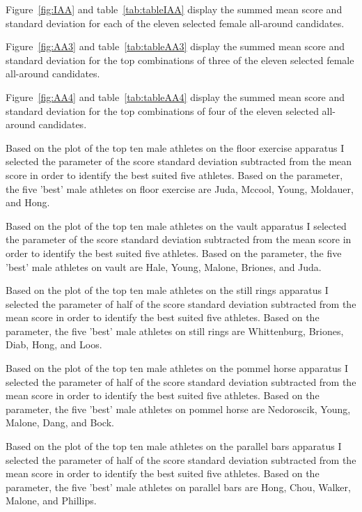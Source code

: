 \documentclass[12pt]{article}
\begin{document}
Figure~\ref{fig:IAA} and table~\ref{tab:tableIAA} display the summed mean score and standard deviation 
for each of the eleven selected female all-around candidates.





Figure~\ref{fig:AA3} and table~\ref{tab:tableAA3} display the summed mean score and standard deviation 
for the top combinations of three of the eleven selected female all-around candidates.



Figure~\ref{fig:AA4} and table~\ref{tab:tableAA4} display the summed mean score and standard deviation 
for the top combinations of four of the eleven selected all-around candidates.


  Based on the plot of the top ten male athletes on the floor exercise apparatus I selected the parameter of 
  the score standard deviation subtracted from the mean score in order to identify the best suited five 
  athletes. Based on the parameter, the five 'best' male athletes on floor exercise are Juda, Mccool, Young, Moldauer, 
  and Hong.

  Based on the plot of the top ten male athletes on the vault apparatus I selected the parameter of 
  the score standard deviation subtracted from the mean score in order to identify the best suited five 
  athletes. Based on the parameter, the five 'best' male athletes on vault are Hale, Young, Malone, Briones, and 
  Juda.

  Based on the plot of the top ten male athletes on the still rings apparatus I selected the parameter of 
  half of the score standard deviation subtracted from the mean score in order to identify the best suited five 
  athletes. Based on the parameter, the five 'best' male athletes on still rings are Whittenburg, Briones, Diab, 
  Hong, and Loos.

  Based on the plot of the top ten male athletes on the pommel horse apparatus I selected the parameter of 
  half of the score standard deviation subtracted from the mean score in order to identify the best suited five 
  athletes. Based on the parameter, the five 'best' male athletes on pommel horse are Nedoroscik, Young, Malone, 
  Dang, and Bock.

  Based on the plot of the top ten male athletes on the parallel bars apparatus I selected the parameter of 
  half of the score standard deviation subtracted from the mean score in order to identify the best suited five 
  athletes. Based on the parameter, the five 'best' male athletes on parallel bars are Hong, Chou, Walker, Malone, 
  and Phillips.
\end{document}
